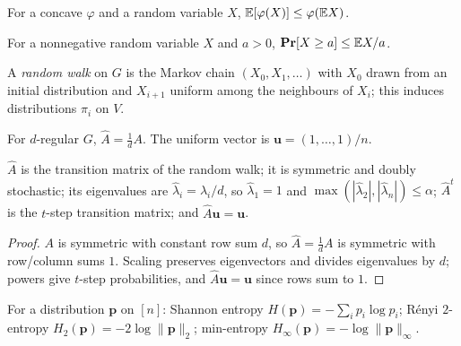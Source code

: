 \begin{lemma}
  \label{lem:jensen}
  \mathlibok
  For a concave $\varphi$ and a random variable $X$,
  $\mathbb{E}[\varphi(X)]\le\varphi(\mathbb{E} X)$.
\end{lemma}

\begin{lemma}
  \label{lem:markov}
  \mathlibok
  For a nonnegative random variable $X$ and $a>0$, $\mathbf{Pr}[X\ge a]\le\mathbb{E} X/a$.
\end{lemma}

\begin{definition}
  \label{def:random-walk}
  A \emph{random walk} on $G$ is the Markov chain $(X_0,X_1,\dots)$ with $X_0$
  drawn from an initial distribution and $X_{i+1}$ uniform among the neighbours
  of $X_i$; this induces distributions $\pi_i$ on $V$.
\end{definition}

\begin{definition}
  \label{def:normalized-adjacency}
  For $d$-regular $G$, $\hat A=\tfrac1d A$. The uniform vector is
  $\mathbf u=(1,\dots,1)/n$.
\end{definition}

\begin{claim}
  \label{claim:Ahat-properties}
  $\hat A$ is the transition matrix of the random walk; it is symmetric and
  doubly stochastic; its eigenvalues are $\hat\lambda_i=\lambda_i/d$, so
  $\hat\lambda_1=1$ and $\max(|\hat\lambda_2|,|\hat\lambda_n|)\le\alpha$; $\hat
  A^t$ is the $t$-step transition matrix; and $\hat A\mathbf u=\mathbf u$.
\end{claim}
\begin{proof}
  $A$ is symmetric with constant row sum $d$, so $\hat A=\tfrac1dA$ is symmetric
  with row/column sums $1$. Scaling preserves eigenvectors and divides
  eigenvalues by $d$; powers give $t$-step probabilities, and
  $\hat A\mathbf u=\mathbf u$ since rows sum to $1$.
\end{proof}

\begin{definition}[Entropies]
  \label{def:entropies}
  For a distribution $\mathbf p$ on $[n]$: Shannon entropy
  $H(\mathbf p)=-\sum_ip_i\log p_i$; Rényi $2$-entropy
  $H_2(\mathbf p)=-2\log\|\mathbf p\|_2$; min-entropy
  $H_\infty(\mathbf p)=-\log\|\mathbf p\|_\infty$.
\end{definition}

